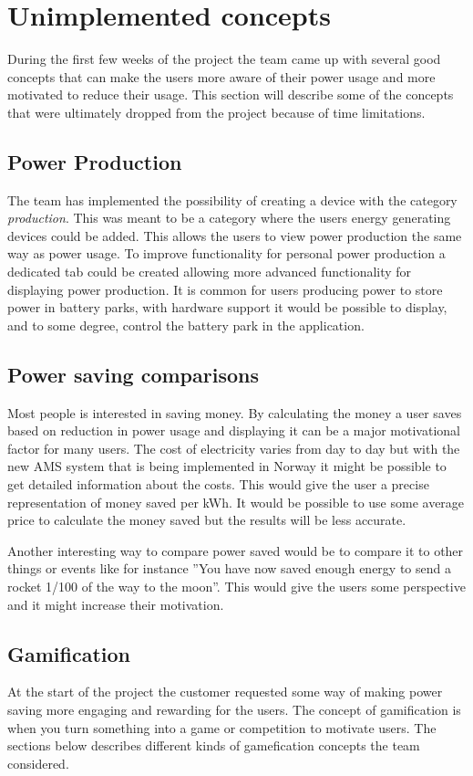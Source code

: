 \section{Unimplemented concepts}
During the first few weeks of the project the team came up with several good concepts that can make the users more aware of their power usage and more motivated to reduce their usage. This section will describe some of the concepts that were ultimately dropped from the project because of time limitations.

\subsection{Power Production}
The team has implemented the possibility of creating a device with the category \emph{production}. This was meant to be a category where the users energy generating devices could be added. This allows the users to view power production the same way as power usage. To improve functionality for personal power production a dedicated tab could be created allowing more advanced functionality for displaying power production.
It is common for users producing power to store power in battery parks, with hardware support it would be possible to display, and to some degree, control the battery park in the application.

\subsection{Power saving comparisons}
\label{sec:psc}
Most people is interested in saving money. By calculating the money a user saves based on reduction in power usage and displaying it can be a major motivational factor for many users. The cost of electricity varies from day to day but with the new AMS\cite{ams} system that is being implemented in Norway it might be possible to get detailed information about the costs. This would give the user a precise representation of money saved per kWh. It would be possible to use some average price to calculate the money saved but the results will be less accurate.

Another interesting way to compare power saved would be to compare it to other things or events like for instance ''You have now saved enough energy to send a rocket 1/100 of the way to the moon''. This would give the users some perspective and it might increase their motivation.

\subsection{Gamification}
At the start of the project the customer requested some way of making power saving more engaging and rewarding for the users. The concept of gamification is when you turn something into a game or competition to motivate users. The sections below describes different kinds of gamefication concepts the team considered.

